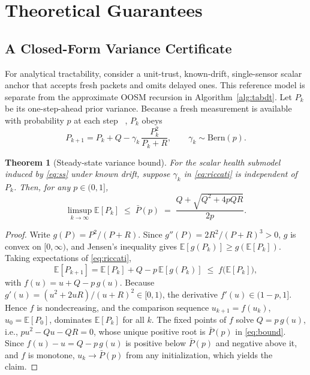\documentclass[journal]{IEEEtran}
\newtheorem{theorem}{Theorem}
\newcommand{\E}{\mathbb{E}}
\newcommand{\Pb}{\bar{P}}
\begin{document}
\section{Theoretical Guarantees}\label{sec:theory}

\subsection{A Closed-Form Variance Certificate}
For analytical tractability, consider a unit-trust, known-drift,
single-sensor scalar anchor that accepts fresh packets and omits delayed ones.
This reference model is separate from the approximate OOSM recursion in
Algorithm~\ref{alg:tabdt}. Let $P_k$ be its one-step-ahead prior variance.
Because a fresh measurement is available with probability $p$ at each step
~\cite{sinopoli2004}, $P_k$ obeys
\begin{equation}\label{eq:riccati}
P_{k+1}=P_k+Q-\gamma_k\,\frac{P_k^{2}}{P_k+R},
\qquad \gamma_k\sim\mathrm{Bern}(p).
\end{equation}

\begin{theorem}[Steady-state variance bound]\label{thm:bound}
For the scalar health submodel induced by \eqref{eq:ss} under known drift,
suppose $\gamma_k$ in \eqref{eq:riccati} is independent of $P_k$. Then, for
any $p\in(0,1]$,
\begin{equation}\label{eq:bound}
\limsup_{k\to\infty}\E[P_k]\;\leq\;
\Pb(p)\;=\;\frac{Q+\sqrt{Q^{2}+4pQR}}{2p}.
\end{equation}
\end{theorem}

\begin{proof}
Write $g(P)=P^{2}/(P+R)$. Since $g''(P)=2R^{2}/(P+R)^{3}>0$, $g$ is convex
on $[0,\infty)$, and Jensen's inequality gives
$\E[g(P_k)]\geq g(\E[P_k])$. Taking expectations of \eqref{eq:riccati},
\[
\E[P_{k+1}]=\E[P_k]+Q-p\,\E[g(P_k)]\;\leq\;f\bigl(\E[P_k]\bigr),
\]
with $f(u)=u+Q-p\,g(u)$. Because
$g'(u)=(u^{2}+2uR)/(u+R)^{2}\in[0,1)$, the derivative $f'(u)\in(1-p,1]$.
Hence $f$ is nondecreasing, and the comparison sequence $u_{k+1}=f(u_k)$,
$u_0=\E[P_0]$, dominates $\E[P_k]$ for all $k$. The fixed points of $f$
solve $Q=p\,g(u)$, i.e., $p u^{2}-Qu-QR=0$, whose unique positive root is
$\Pb(p)$ in \eqref{eq:bound}. Since $f(u)-u=Q-p\,g(u)$ is positive below
$\Pb(p)$ and negative above it, and $f$ is monotone, $u_k\to\Pb(p)$ from
any initialization, which yields the claim.
\end{proof}
\end{document}
